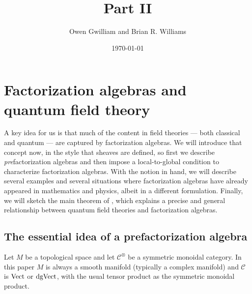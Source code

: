 \documentclass[11pt]{amsart}
\author{Owen Gwilliam and Brian R. Williams}
\date{\today}
\title{Part II}
\def\mc{\mathcal}
\begin{document}
\maketitle


\section{Factorization algebras and quantum field theory}
\label{prefactorization_algebras}

A key idea for us is that much of the content in field theories --- both classical and quantum --- are captured by factorization algebras.
We will introduce that concept now, in the style that sheaves are defined, so first we describe {\em pre}\/factorization algebras and then impose a local-to-global condition to characterize factorization algebras.
With the notion in hand, we will describe several examples and several situations where factorization algebras have already appeared in mathematics and physics, 
albeit in a different formulation.
Finally, we will sketch the main theorem of \cite{CG2}, 
which explains a precise and general relationship between quantum field theories and factorization algebras.

\subsection{The essential idea of a prefactorization algebra}

Let $M$ be a topological space and let $\mc{C}^\otimes$ be a symmetric monoidal category. 
In this paper $M$ is always a smooth manifold (typically a complex manifold) and $\mc{C}$ is ${\rm Vect}$ or ${\rm dgVect}$, with the usual tensor product as the symmetric monoidal product.
\end{document}
